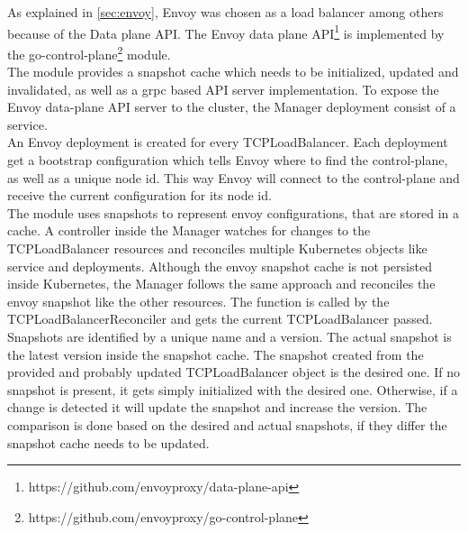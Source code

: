 As explained in \autoref{sec:envoy}, Envoy was chosen as a load balancer among others because of the Data plane API.
The Envoy data plane API\footnote{https://github.com/envoyproxy/data-plane-api} is implemented by the go-control-plane\footnote{https://github.com/envoyproxy/go-control-plane} module.
\\
The module provides a snapshot cache which needs to be initialized, updated and invalidated, as well as a grpc based API server implementation.
To expose the Envoy data-plane API server to the cluster, the Manager deployment consist of a service.
\\
An Envoy deployment is created for every TCPLoadBalancer.
Each deployment get a bootstrap configuration which tells Envoy where to find the control-plane, as well as a unique node id.
This way Envoy will connect to the control-plane and receive the current configuration for its node id.
\\
The module uses snapshots to represent envoy configurations, that are stored in a cache.
A controller inside the Manager watches for changes to the TCPLoadBalancer resources and reconciles multiple Kubernetes objects like service and deployments.
Although the envoy snapshot cache is not persisted inside Kubernetes, the Manager follows the same approach and reconciles the envoy snapshot like the other resources.
The function is called by the TCPLoadBalancerReconciler and gets the current TCPLoadBalancer passed.
Snapshots are identified by a unique name and a version.
The actual snapshot is the latest version inside the snapshot cache.
The snapshot created from the provided and probably updated TCPLoadBalancer object is the desired one.
If no snapshot is present, it gets simply initialized with the desired one.
Otherwise, if a change is detected it will update the snapshot and increase the version.
The comparison is done based on the desired and actual snapshots, if they differ the snapshot cache needs to be updated.
\\

